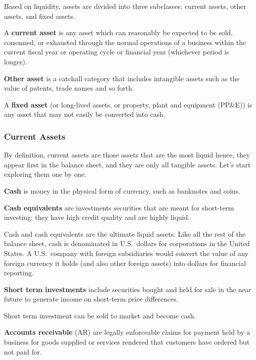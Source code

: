 Based on liquidity, assets are divided into three subclasses: current assets, other assets, and fixed assets.

A \textbf{current asset} is any asset which can reasonably be expected to be sold, consumed, or exhausted through the
normal operations of a business within the current fiscal year or operating cycle or financial year (whichever period is
longer).
\ed

\textbf{Other asset} is a catchall category that includes intangible assets such as the value of patents, trade names
and so forth.
\ed

A \textbf{fixed asset} (or long-lived assets, or property, plant and equipment (PP\&E)) is any asset that may not
easily be converted into cash.
\ed

\subsubsection{Current Assets}

By definition, current assets are those assets that are the most liquid hence, they appear first in the balance sheet,
and they are only all tangible assets. Let's start exploring them one by one.

\bd[Cash]
\textbf{Cash} is money in the physical form of currency, such as banknotes and coins.
\ed

\textbf{Cash equivalents} are investments securities that are meant for short-term investing; they have high credit
quality and are highly liquid.
\ed

Cash and cash equivalents are the ultimate liquid assets. Like all the rest of the balance sheet, cash is denominated
in U.S.\ dollars for corporations in the United States. A U.S.\ company with foreign subsidiaries would convert the
value of any foreign currency it holds (and also other foreign assets) into dollars for financial reporting.

\textbf{Short term investments} include securities bought and held for sale in the near future to generate income on
short-term price differences.
\ed

Short term investment can be sold to market and become cash.

\textbf{Accounts receivable} (AR) are legally enforceable claims for payment held by a business for goods supplied or
services rendered that customers have ordered but not paid for.
\ed

